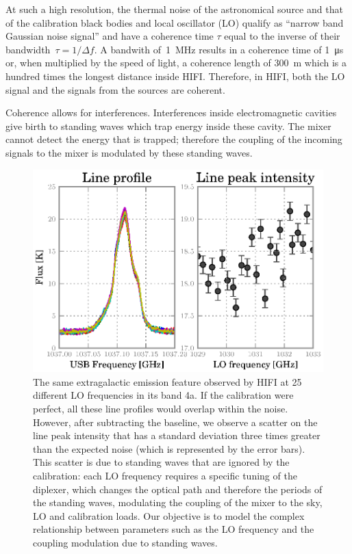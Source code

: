 \documentclass[a4paper,11pt]{article}
\begin{document}
At such a high resolution, the thermal noise of the astronomical source and that of the calibration black bodies and local oscillator (LO) qualify as ``narrow band Gaussian noise signal'' \cite{siegman1986lasers} and have a coherence time $\tau$ equal to the inverse of their bandwidth~$\tau=1/\Delta f$.
A bandwith of~\SI{1}{\mega\hertz} results in a coherence time of \SI{1}{\micro\second} or, when multiplied by the speed of light, a coherence length of \SI{300}{\meter} which is a hundred times the longest distance inside HIFI.
Therefore, in HIFI, both the LO signal and the signals from the sources are coherent.

Coherence allows for interferences.
Interferences inside electromagnetic cavities give birth to standing waves which trap energy inside these cavity.
The mixer cannot detect the energy that is trapped; 
therefore the coupling of the incoming signals to the mixer is modulated by these standing waves.

\begin{figure}[hbt]
    \centering
    \includegraphics{obsid_5000352C}
    \caption{\label{fig:scatter_real_data}
    The same extragalactic emission feature observed by HIFI at 25 different LO frequencies in its band 4a.
    If the calibration were perfect, all these line profiles would overlap within the noise.
    However, after subtracting the baseline, we observe a scatter on the line peak intensity that has a standard deviation three times greater than the expected noise (which is represented by the error bars).
    This scatter is due to standing waves that are ignored by the calibration: each LO frequency requires a specific tuning of the diplexer, which changes the optical path and therefore the periods of the standing waves, modulating the coupling of the mixer to the sky, LO and calibration loads.
    Our objective is to model the complex relationship between parameters such as the LO frequency and the coupling modulation due to standing waves.
    }
\end{figure}
\end{document}
